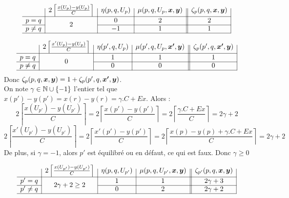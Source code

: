 \documentclass[twoside,11pt,openany,a4paper]{rapport}
\begin{document}
\begin{gather*}
  \begin{array}{c|c|c|c||c|}
    & 2 \left\lceil \frac{x(U_p)-y(U_p)}{C} \right\rceil
    & \eta(p,q,U_p)
    & \mu(p,q,U_p,\bs{x},\bs{y})
    & \zeta_p(p,q,\bs{x},\bs{y})
    \\ \hline
    p=q
    & \multirow{2}{*}{$2$}
    & 0
    & 2
    & 2
    \\ \cline{1-1}\cline{3-5}
    p \ne q
    &
    & -1
    & 1
    & 1
    \\ \hline
  \end{array}
\end{gather*}

\begin{gather*}
  \begin{array}{c|c|c|c||c|}
    & 2 \left\lceil \frac{x'(U_p)-y(U_p)}{C} \right\rceil
    & \eta(p',q,U_p)
    & \mu(p',q,U_p,\bs{x'},\bs{y})
    & \zeta_p(p',q,\bs{x'},\bs{y})
    \\ \hline
    p=q
    & \multirow{2}{*}{$0$}
    & 1
    & 1
    & 1
    \\ \cline{1-1}\cline{3-5}
    p \ne q
    &
    & 0
    & 0
    & 0
    \\ \hline
  \end{array}
\end{gather*}
Donc $\zeta_p(p,q,\boldsymbol{x},\boldsymbol{y}) = 1 + \zeta_p(p',q,\boldsymbol{x'},\boldsymbol{y})$.
\\

On note $\gamma \in \mathbb{N} \cup \{-1\}$ l'entier tel que $x(p')-y(p') = x(r)-y(r) = \gamma. C + Ex$. Alors :
\[
2 \left\lceil \frac{x(U_{p'})-y(U_{p'})}{C} \right\rceil
= 2 \left\lceil \frac{x(p')-y(p')}{C} \right\rceil
= 2 \left\lceil \frac{\gamma. C + Ex}{C} \right\rceil
= 2\gamma + 2
\]
\[
2 \left\lceil \frac{x'(U_{p'})-y(U_{p'})}{C} \right\rceil
= 2 \left\lceil \frac{x'(p')-y(p')}{C} \right\rceil
= 2 \left\lceil \frac{x(p)-y(p)+\gamma. C + Ex}{C} \right\rceil
= 2\gamma + 2
\]
De plus, si $\gamma = -1$, alors $p'$ est équilibré ou en défaut, ce qui est faux. Donc $\gamma \ge 0$

\begin{gather*}
  \begin{array}{c|c|c|c||c|}
    & 2 \left\lceil \frac{x(U_{p'})-y(U_{p'})}{C} \right\rceil
    & \eta(p,q,U_{p'})
    & \mu(p,q,U_{p'},\bs{x},\bs{y})
    & \zeta_{p'}(p,q,\bs{x},\bs{y})
    \\ \hline
    p'=q
    & \multirow{2}{*}{$2 \gamma + 2 \ge 2$}
    & 1
    & 1
    & 2 \gamma + 3
    \\ \cline{1-1}\cline{3-5}
    p' \ne q
    &
    & 0
    & 2
    & 2\gamma + 2
    \\ \hline
  \end{array}
\end{gather*}
\end{document}

